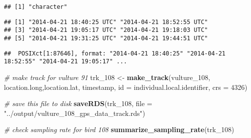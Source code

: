 \documentclass[
]{article}
\newenvironment{Shaded}{\begin{snugshade}}{\end{snugshade}}
\newcommand{\AttributeTok}[1]{\textcolor[rgb]{0.13,0.29,0.53}{#1}}
\newcommand{\CommentTok}[1]{\textcolor[rgb]{0.56,0.35,0.01}{\textit{#1}}}
\newcommand{\DecValTok}[1]{\textcolor[rgb]{0.00,0.00,0.81}{#1}}
\newcommand{\FunctionTok}[1]{\textcolor[rgb]{0.13,0.29,0.53}{\textbf{#1}}}
\newcommand{\NormalTok}[1]{#1}
\newcommand{\OtherTok}[1]{\textcolor[rgb]{0.56,0.35,0.01}{#1}}
\newcommand{\SpecialCharTok}[1]{\textcolor[rgb]{0.81,0.36,0.00}{\textbf{#1}}}
\newcommand{\StringTok}[1]{\textcolor[rgb]{0.31,0.60,0.02}{#1}}
\begin{document}
\begin{Shaded}
\end{Shaded}

\begin{verbatim}
## [1] "character"
\end{verbatim}

\begin{Shaded}
\end{Shaded}

\begin{verbatim}
## [1] "2014-04-21 18:40:25 UTC" "2014-04-21 18:52:55 UTC"
## [3] "2014-04-21 19:05:17 UTC" "2014-04-21 19:18:03 UTC"
## [5] "2014-04-21 19:31:25 UTC" "2014-04-21 19:44:51 UTC"
\end{verbatim}

\begin{Shaded}
\end{Shaded}

\begin{verbatim}
##  POSIXct[1:87646], format: "2014-04-21 18:40:25" "2014-04-21 18:52:55" "2014-04-21 19:05:17" ...
\end{verbatim}

\begin{Shaded}
\begin{Highlighting}[]
\CommentTok{\# make track for vulture 91}
\NormalTok{trk\_108 }\OtherTok{\textless{}{-}} \FunctionTok{make\_track}\NormalTok{(vulture\_108, location.long,location.lat, timestamp, }\AttributeTok{id =}\NormalTok{ individual.local.identifier, }\AttributeTok{crs =} \DecValTok{4326}\NormalTok{)}

\CommentTok{\# save this file to disk}
\FunctionTok{saveRDS}\NormalTok{(trk\_108, }\AttributeTok{file =} \StringTok{"../output/vulture\_108\_gps\_data\_track.rds"}\NormalTok{)}

\CommentTok{\# check sampling rate for bird 108}
\FunctionTok{summarize\_sampling\_rate}\NormalTok{(trk\_108)}
\end{Highlighting}
\end{Shaded}
\end{document}
